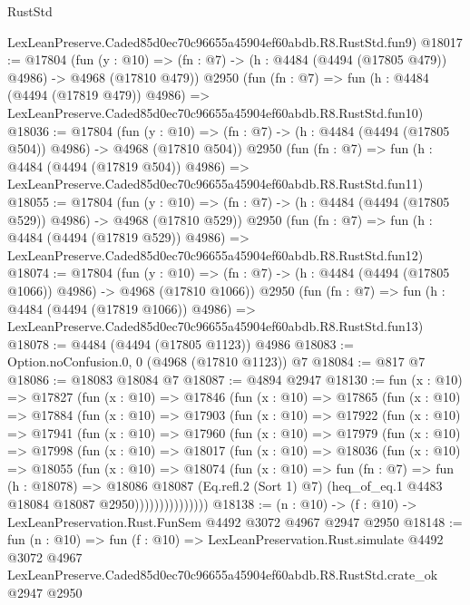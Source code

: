 \begin{lexlean}{RustStd}
\begin{coremodule}
    LexLeanPreserve.Caded85d0ec70c96655a45904ef60abdb.R8.RustStd.fun9)
@18017 := @17804
    (fun (y : @10) => (fn : @7) -> (h : @4484 (@4494 (@17805 @479)) @4986) -> @4968 (@17810 @479))
    @2950
    (fun (fn : @7) =>
    fun (h : @4484 (@4494 (@17819 @479)) @4986) =>
    LexLeanPreserve.Caded85d0ec70c96655a45904ef60abdb.R8.RustStd.fun10)
@18036 := @17804
    (fun (y : @10) => (fn : @7) -> (h : @4484 (@4494 (@17805 @504)) @4986) -> @4968 (@17810 @504))
    @2950
    (fun (fn : @7) =>
    fun (h : @4484 (@4494 (@17819 @504)) @4986) =>
    LexLeanPreserve.Caded85d0ec70c96655a45904ef60abdb.R8.RustStd.fun11)
@18055 := @17804
    (fun (y : @10) => (fn : @7) -> (h : @4484 (@4494 (@17805 @529)) @4986) -> @4968 (@17810 @529))
    @2950
    (fun (fn : @7) =>
    fun (h : @4484 (@4494 (@17819 @529)) @4986) =>
    LexLeanPreserve.Caded85d0ec70c96655a45904ef60abdb.R8.RustStd.fun12)
@18074 := @17804
    (fun (y : @10) => (fn : @7) -> (h : @4484 (@4494 (@17805 @1066)) @4986) -> @4968 (@17810 @1066))
    @2950
    (fun (fn : @7) =>
    fun (h : @4484 (@4494 (@17819 @1066)) @4986) =>
    LexLeanPreserve.Caded85d0ec70c96655a45904ef60abdb.R8.RustStd.fun13)
@18078 := @4484 (@4494 (@17805 @1123)) @4986
@18083 := Option.noConfusion.{0, 0} (@4968 (@17810 @1123)) @7
@18084 := @817 @7
@18086 := @18083 @18084 @7
@18087 := @4894 @2947
@18130 := fun (x : @10) =>
  @17827
    (fun (x : @10) =>
    @17846
      (fun (x : @10) =>
      @17865
        (fun (x : @10) =>
        @17884
          (fun (x : @10) =>
          @17903
            (fun (x : @10) =>
            @17922
              (fun (x : @10) =>
              @17941
                (fun (x : @10) =>
                @17960
                  (fun (x : @10) =>
                  @17979
                    (fun (x : @10) =>
                    @17998
                      (fun (x : @10) =>
                      @18017
                        (fun (x : @10) =>
                        @18036
                          (fun (x : @10) =>
                          @18055
                            (fun (x : @10) =>
                            @18074
                              (fun (x : @10) =>
                              fun (fn : @7) =>
                              fun (h : @18078) =>
                              @18086
                                @18087
                                (Eq.refl.{2} (Sort 1) @7)
                                (heq_of_eq.{1} @4483 @18084 @18087 @2950)))))))))))))))
@18138 := (n : @10) -> (f : @10) -> LexLeanPreservation.Rust.FunSem @4492 @3072 @4967 @2947 @2950
@18148 := fun (n : @10) =>
  fun (f : @10) =>
  LexLeanPreservation.Rust.simulate
    @4492
    @3072
    @4967
    LexLeanPreserve.Caded85d0ec70c96655a45904ef60abdb.R8.RustStd.crate_ok
    @2947
    @2950
\end{coremodule}
\end{lexlean}
